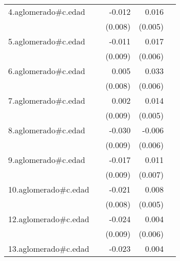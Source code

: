 {\begin{longtable}{l*{4}{D{.}{.}{-1}}}
\addlinespace
4.aglomerado#c.edad&                     &      -0.012         &       0.016\sym{**} &                     \\
            &                     &     (0.008)         &     (0.005)         &                     \\
\addlinespace
5.aglomerado#c.edad&                     &      -0.011         &       0.017\sym{**} &                     \\
            &                     &     (0.009)         &     (0.006)         &                     \\
\addlinespace
6.aglomerado#c.edad&                     &       0.005         &       0.033\sym{***}&                     \\
            &                     &     (0.008)         &     (0.006)         &                     \\
\addlinespace
7.aglomerado#c.edad&                     &       0.002         &       0.014\sym{**} &                     \\
            &                     &     (0.009)         &     (0.005)         &                     \\
\addlinespace
8.aglomerado#c.edad&                     &      -0.030\sym{**} &      -0.006         &                     \\
            &                     &     (0.009)         &     (0.006)         &                     \\
\addlinespace
9.aglomerado#c.edad&                     &      -0.017         &       0.011         &                     \\
            &                     &     (0.009)         &     (0.007)         &                     \\
\addlinespace
10.aglomerado#c.edad&                     &      -0.021\sym{*}  &       0.008         &                     \\
            &                     &     (0.008)         &     (0.005)         &                     \\
\addlinespace
12.aglomerado#c.edad&                     &      -0.024\sym{**} &       0.004         &                     \\
            &                     &     (0.009)         &     (0.006)         &                     \\
\addlinespace
13.aglomerado#c.edad&                     &      -0.023\sym{**} &       0.004         &                     \\

\end{longtable}}

